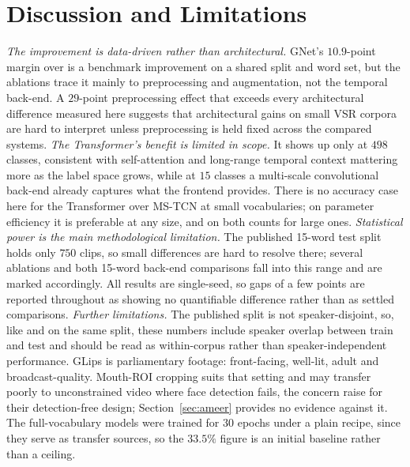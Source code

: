 \documentclass[10pt, a4paper]{article}
\begin{document}
\section{Discussion and Limitations}
\noindent\emph{The improvement is data-driven rather than architectural.} GNet's $10.9$-point margin over \citet{ameer2024} is a benchmark improvement on a shared split and word set, but the ablations trace it mainly to preprocessing and augmentation, not the temporal back-end. A $29$-point preprocessing effect that exceeds every architectural difference measured here suggests that architectural gains on small VSR corpora are hard to interpret unless preprocessing is held fixed across the compared systems.
\noindent\emph{The Transformer's benefit is limited in scope.} It shows up only at $498$ classes, consistent with self-attention and long-range temporal context mattering more as the label space grows, while at $15$ classes a multi-scale convolutional back-end already captures what the frontend provides. There is no accuracy case here for the Transformer over MS-TCN at small vocabularies; on parameter efficiency it is preferable at any size, and on both counts for large ones.
\noindent\emph{Statistical power is the main methodological limitation.} The published 15-word test split holds only $750$ clips, so small differences are hard to resolve there; several ablations and both 15-word back-end comparisons fall into this range and are marked accordingly. All results are single-seed, so gaps of a few points are reported throughout as showing no quantifiable difference rather than as settled comparisons.
\noindent\emph{Further limitations.} The published split is not speaker-disjoint, so, like \citet{ameer2024} and \citet{schwiebert2022glips} on the same split, these numbers include speaker overlap between train and test and should be read as within-corpus rather than speaker-independent performance. GLips is parliamentary footage: front-facing, well-lit, adult and broadcast-quality. Mouth-ROI cropping suits that setting and may transfer poorly to unconstrained video where face detection fails, the concern \citet{ameer2024} raise for their detection-free design; Section~\ref{sec:ameer} provides no evidence against it. The full-vocabulary models were trained for $30$ epochs under a plain recipe, since they serve as transfer sources, so the $33.5\%$ figure is an initial baseline rather than a ceiling.
\end{document}
